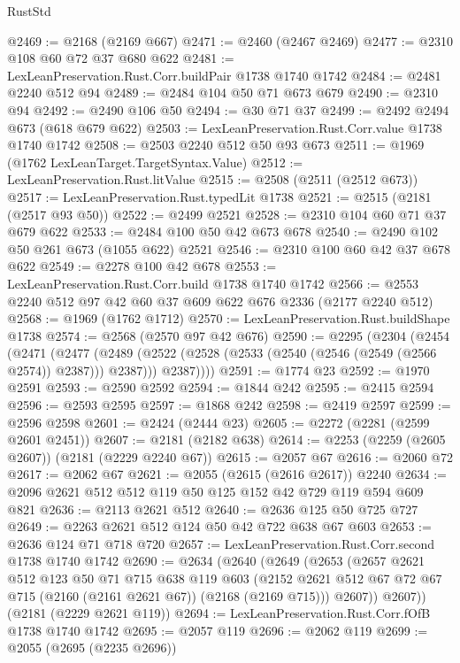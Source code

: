 \begin{lexlean}{RustStd}
\begin{coremodule}
@2469 := @2168 (@2169 @667)
@2471 := @2460 (@2467 @2469)
@2477 := @2310 @108 @60 @72 @37 @680 @622
@2481 := LexLeanPreservation.Rust.Corr.buildPair @1738 @1740 @1742
@2484 := @2481 @2240 @512 @94
@2489 := @2484 @104 @50 @71 @673 @679
@2490 := @2310 @94
@2492 := @2490 @106 @50
@2494 := @30 @71 @37
@2499 := @2492 @2494 @673 (@618 @679 @622)
@2503 := LexLeanPreservation.Rust.Corr.value @1738 @1740 @1742
@2508 := @2503 @2240 @512 @50 @93 @673
@2511 := @1969 (@1762 LexLeanTarget.TargetSyntax.Value)
@2512 := LexLeanPreservation.Rust.litValue
@2515 := @2508 (@2511 (@2512 @673))
@2517 := LexLeanPreservation.Rust.typedLit @1738
@2521 := @2515 (@2181 (@2517 @93 @50))
@2522 := @2499 @2521
@2528 := @2310 @104 @60 @71 @37 @679 @622
@2533 := @2484 @100 @50 @42 @673 @678
@2540 := @2490 @102 @50 @261 @673 (@1055 @622) @2521
@2546 := @2310 @100 @60 @42 @37 @678 @622
@2549 := @2278 @100 @42 @678
@2553 := LexLeanPreservation.Rust.Corr.build @1738 @1740 @1742
@2566 := @2553 @2240 @512 @97 @42 @60 @37 @609 @622 @676 @2336 (@2177 @2240 @512)
@2568 := @1969 (@1762 @1712)
@2570 := LexLeanPreservation.Rust.buildShape @1738
@2574 := @2568 (@2570 @97 @42 @676)
@2590 := @2295
    (@2304
      (@2454
        (@2471
          (@2477
            (@2489 (@2522 (@2528 (@2533 (@2540 (@2546 (@2549 (@2566 @2574)) @2387))) @2387)))
            @2387))))
@2591 := @1774 @23
@2592 := @1970 @2591
@2593 := @2590 @2592
@2594 := @1844 @242
@2595 := @2415 @2594
@2596 := @2593 @2595
@2597 := @1868 @242
@2598 := @2419 @2597
@2599 := @2596 @2598
@2601 := @2424 (@2444 @23)
@2605 := @2272 (@2281 (@2599 @2601 @2451))
@2607 := @2181 (@2182 @638)
@2614 := @2253 (@2259 (@2605 @2607)) (@2181 (@2229 @2240 @67))
@2615 := @2057 @67
@2616 := @2060 @72
@2617 := @2062 @67
@2621 := @2055 (@2615 (@2616 @2617)) @2240
@2634 := @2096 @2621 @512 @512 @119 @50 @125 @152 @42 @729 @119 @594 @609 @821
@2636 := @2113 @2621 @512
@2640 := @2636 @125 @50 @725 @727
@2649 := @2263 @2621 @512 @124 @50 @42 @722 @638 @67 @603
@2653 := @2636 @124 @71 @718 @720
@2657 := LexLeanPreservation.Rust.Corr.second @1738 @1740 @1742
@2690 := @2634
    (@2640
      (@2649
        (@2653
          (@2657
            @2621
            @512
            @123
            @50
            @71
            @715
            @638
            @119
            @603
            (@2152 @2621 @512 @67 @72 @67 @715 (@2160 (@2161 @2621 @67)) (@2168 (@2169 @715)))
            @2607))
        @2607))
    (@2181 (@2229 @2621 @119))
@2694 := LexLeanPreservation.Rust.Corr.fOfB @1738 @1740 @1742
@2695 := @2057 @119
@2696 := @2062 @119
@2699 := @2055 (@2695 (@2235 @2696))

\end{coremodule}
\end{lexlean}
